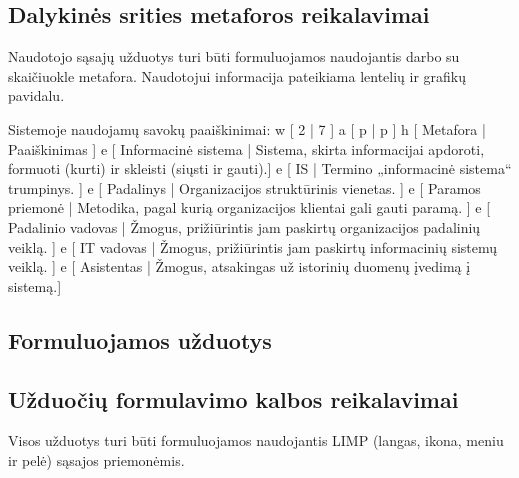 \subsection{Dalykinės srities metaforos reikalavimai}
{
  Naudotojo sąsajų užduotys turi būti formuluojamos naudojantis darbo
  su skaičiuokle metafora. Naudotojui informacija pateikiama lentelių
  ir grafikų pavidalu.

  Sistemoje naudojamų savokų paaiškinimai:
  \xtable
  {
    w [ 2 | 7 ]
    a [ p | p ]
    h [ Metafora | Paaiškinimas ]
    e [ Informacinė sistema |
      Sistema, skirta informacijai apdoroti, formuoti (kurti) ir skleisti
      (siųsti ir gauti).]
    e [ IS | Termino „informacinė sistema“ trumpinys. ]
    e [ Padalinys | Organizacijos struktūrinis vienetas. ]
    e [ Paramos priemonė |
      Metodika, pagal kurią organizacijos klientai gali gauti paramą. ]
    e [ Padalinio vadovas |
      Žmogus, prižiūrintis jam paskirtų organizacijos padalinių veiklą. ]
    e [ IT vadovas |
      Žmogus, prižiūrintis jam paskirtų informacinių sistemų veiklą. ]
    e [ Asistentas |
      Žmogus, atsakingas už istorinių duomenų įvedimą į sistemą.]
  }
}

\subsection{Formuluojamos užduotys}

\subsection{Užduočių formulavimo kalbos reikalavimai}
{Visos užduotys turi būti formuluojamos naudojantis LIMP (langas, ikona,
meniu ir pelė) sąsajos priemonėmis.}

